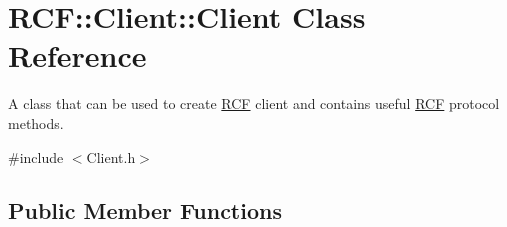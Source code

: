 \hypertarget{class_r_c_f_1_1_client_1_1_client}{}\section{R\+C\+F\+:\+:Client\+:\+:Client Class Reference}
\label{class_r_c_f_1_1_client_1_1_client}


A class that can be used to create \hyperlink{namespace_r_c_f}{R\+C\+F} client and contains useful \hyperlink{namespace_r_c_f}{R\+C\+F} protocol methods.  




{\ttfamily \#include $<$Client.\+h$>$}

\subsection*{Public Member Functions}
